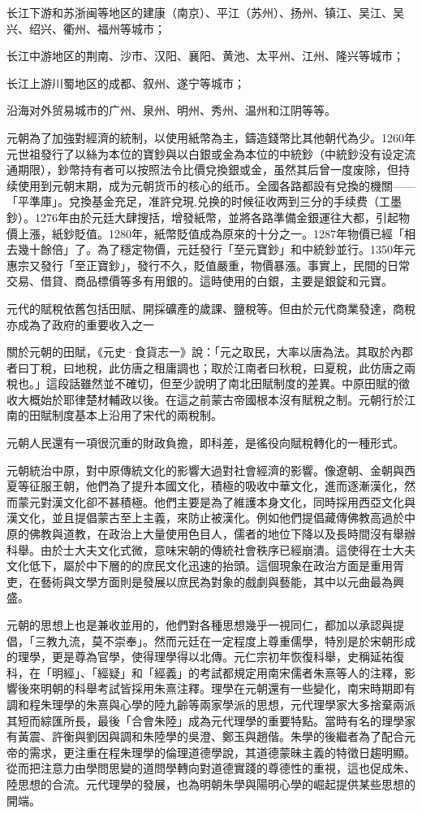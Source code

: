 长江下游和苏浙闽等地区的建康（南京）、平江（苏州）、扬州、镇江、吴江、吴兴、绍兴、衢州、福州等城市；

长江中游地区的荆南、沙市、汉阳、襄阳、黄池、太平州、江州、隆兴等城市；

长江上游川蜀地区的成都、叙州、遂宁等城市；

沿海对外贸易城市的广州、泉州、明州、秀州、温州和江阴等等。

元朝為了加強對經濟的統制，以使用紙幣為主，鑄造錢幣比其他朝代為少。1260年元世祖發行了以絲为本位的寶鈔與以白銀或金為本位的中統鈔（中統鈔没有设定流通期限），鈔幣持有者可以按照法令比價兌換銀或金，虽然其后曾一度废除，但持续使用到元朝末期，成为元朝货币的核心的纸币。全國各路都設有兌換的機關——「平準庫」。兌換基金充足，准許兌現,兑换的时候征收两到三分的手续费（工墨鈔）。1276年由於元廷大肆搜括，增發紙幣，並將各路準備金銀運往大都，引起物價上漲，紙鈔貶值。1280年，紙幣貶值成為原來的十分之一。1287年物價已經「相去幾十餘倍」了。為了穩定物價，元廷發行「至元寶鈔」和中統鈔並行。1350年元惠宗又發行「至正寶鈔」，發行不久，貶值嚴重，物價暴漲。事實上，民間的日常交易、借貸、商品標價等多有用銀的。這時使用的白銀，主要是銀錠和元寶。

元代的賦稅依舊包括田賦、開採礦產的歲課、鹽稅等。但由於元代商業發達，商稅亦成為了政府的重要收入之一

關於元朝的田賦，《元史·食貨志一》說：「元之取民，大率以唐為法。其取於內郡者曰丁稅，曰地稅，此仿唐之租庸調也；取於江南者曰秋稅，曰夏稅，此仿唐之兩稅也。」這段話雖然並不確切，但至少說明了南北田賦制度的差異。中原田賦的徵收大概始於耶律楚材輔政以後。在這之前蒙古帝國根本沒有賦稅之制。元朝行於江南的田賦制度基本上沿用了宋代的兩稅制。

元朝人民還有一項很沉重的財政負擔，即科差，是徭役向賦稅轉化的一種形式。

元朝統治中原，對中原傳統文化的影響大過對社會經濟的影響。像遼朝、金朝與西夏等征服王朝，他們為了提升本國文化，積極的吸收中華文化，進而逐漸漢化，然而蒙元對漢文化卻不甚積極。他們主要是為了維護本身文化，同時採用西亞文化與漢文化，並且提倡蒙古至上主義，來防止被漢化。例如他們提倡藏傳佛教高過於中原的佛教與道教，在政治上大量使用色目人，儒者的地位下降以及長時間沒有舉辦科舉。由於士大夫文化式微，意味宋朝的傳統社會秩序已經崩潰。這使得在士大夫文化低下，屬於中下層的的庶民文化迅速的抬頭。這個現象在政治方面是重用胥吏，在藝術與文學方面則是發展以庶民為對象的戲劇與藝能，其中以元曲最為興盛。

元朝的思想上也是兼收並用的，他們對各種思想幾乎一視同仁，都加以承認與提倡，「三教九流，莫不崇奉」。然而元廷在一定程度上尊重儒學，特別是於宋朝形成的理學，更是尊為官學，使得理學得以北傳。元仁宗初年恢復科舉，史稱延祐復科，在「明經」、「經疑」和「經義」的考試都規定用南宋儒者朱熹等人的注釋，影響後來明朝的科舉考試皆採用朱熹注釋。理學在元朝還有一些變化，南宋時期即有調和程朱理學的朱熹與心學的陸九齡等兩家學派的思想，元代理學家大多捨棄兩派其短而綜匯所長，最後「合會朱陸」成為元代理學的重要特點。當時有名的理學家有黃震、許衡與劉因與調和朱陸學的吳澄、鄭玉與趙偕。朱學的後繼者為了配合元帝的需求，更注重在程朱理學的倫理道德學說，其道德蒙昧主義的特徵日趨明顯。從而把注意力由學問思變的道問學轉向對道德實踐的尊德性的重視，這也促成朱、陸思想的合流。元代理學的發展，也為明朝朱學與陽明心學的崛起提供某些思想的開端。

